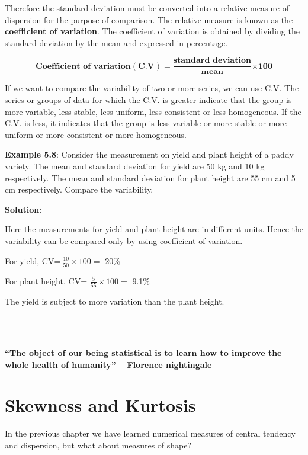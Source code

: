 \documentclass[
]{book}
\begin{document}
Therefore the standard deviation must be converted into a relative
measure of dispersion for the purpose of comparison. The relative
measure is known as the \textbf{coefficient of variation}. The coefficient of
variation is obtained by dividing the standard deviation by the mean and
expressed in percentage.

\[\mathbf{\text{Coefficient of variation}}\left( \mathbf{C}\mathbf{.}\mathbf{V} \right)\mathbf{=}\frac{\mathbf{\text{standard deviation}}}{\mathbf{\text{mean}}}\mathbf{\times 100}\]

If we want to compare the variability of two or more series, we can use
C.V. The series or groups of data for which the C.V. is greater indicate
that the group is more variable, less stable, less uniform, less
consistent or less homogeneous. If the C.V. is less, it indicates that
the group is less variable or more stable or more uniform or more
consistent or more homogeneous.

\textbf{Example 5.8}: Consider the measurement on yield and plant height of a
paddy variety. The mean and standard deviation for yield are 50 kg and
10 kg respectively. The mean and standard deviation for plant height are
55 cm and 5 cm respectively. Compare the variability.

\textbf{Solution}:

Here the measurements for yield and plant height are in different units.
Hence the variability can be compared only by using coefficient of
variation.

For yield, CV=\(\ \frac{10}{50} \times 100 =\) 20\%

For plant height, CV= \(\frac{5}{55} \times 100 =\) 9.1\%

The yield is subject to more variation than the plant height.

~\\
\hspace*{0.333em}\\
\hspace*{0.333em}

\hypertarget{hello}{}
\textbf{``The object of our being statistical is to learn how to improve the whole health of humanity'' -- Florence nightingale}

\hypertarget{skewness-and-kurtosis}{%
\chapter{Skewness and Kurtosis}\label{skewness-and-kurtosis}}

In the previous chapter we have learned numerical measures of central
tendency and dispersion, but what about measures of shape?
\end{document}

